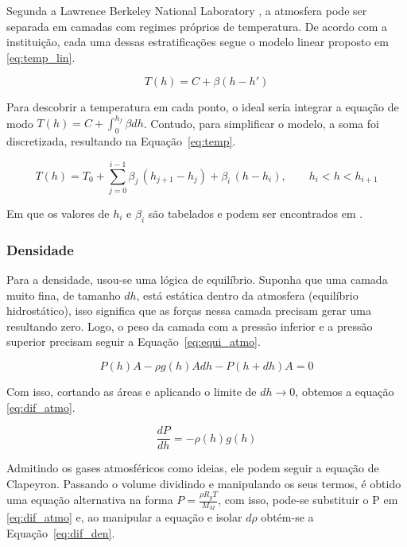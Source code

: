 Segunda a Lawrence Berkeley National Laboratory \cite{LBL_StandardAtmosphere}, a atmosfera pode ser separada em camadas com regimes próprios de temperatura. De acordo com a instituição, cada uma dessas estratificações segue o modelo linear proposto em \eqref{eq:temp_lin}.

\begin{equation}
  T(h) = C + \beta(h-h')
  \label{eq:temp_lin}
\end{equation}

Para descobrir a temperatura em cada ponto, o ideal seria integrar a equação de modo \(T(h)=C+\int_{0}^{h_f}\beta dh\). Contudo, para simplificar o modelo, a soma foi discretizada, resultando na Equação~\eqref{eq:temp}.

\begin{equation}
  T(h)=T_0+ \sum_{j=0}^{i-1} \beta_j\,(h_{j+1}-h_j) + \beta_i\,(h-h_i), \qquad h_i<h<h_{i+1}
  \label{eq:temp}
\end{equation}

Em que os valores de \(h_i\) e \(\beta_i\) são tabelados e podem ser encontrados em \cite{LBL_StandardAtmosphere}.

\subsubsection{Densidade}

Para a densidade, usou-se uma lógica de equilíbrio. Suponha que uma camada muito fina, de tamanho \(dh\), está estática dentro da atmosfera (equilíbrio hidrostático), isso significa que as forças nessa camada precisam gerar uma resultando zero. Logo, o peso da camada com a pressão inferior e a pressão superior precisam seguir a Equação~\eqref{eq:equi_atmo}.

\begin{equation}
  P(h)A - \rho g(h) A dh - P(h+dh)A=0
  \label{eq:equi_atmo}
\end{equation}

Com isso, cortando as áreas e aplicando o limite de \(dh\to 0\), obtemos a equação \eqref{eq:dif_atmo}.

\begin{equation}
  \frac{dP}{dh} = -\rho(h)g(h)
  \label{eq:dif_atmo}
\end{equation}

Admitindo os gases atmosféricos como ideias, ele podem seguir a equação de Clapeyron. Passando o volume dividindo e manipulando os seus termos, é obtido uma equação alternativa na forma \(P=\frac{\rho R_g T}{M_M}\), com isso, pode-se substituir o P em \eqref{eq:dif_atmo} e, ao manipular a equação e isolar \(d\rho\) obtém-se a Equação~\eqref{eq:dif_den}.

